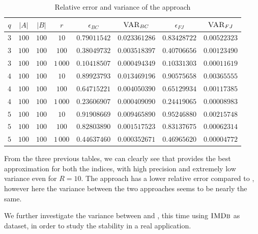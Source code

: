 \begin{table}[h]
	\centering
	\begin{tabular}{|c|c|c|c|c|c|c|c|}
		\hline
		$q$ & $|A|$ & $|B|$ & $r$      & $\epsilon_{BC}$ & $\textsc{VAR}_{BC}$ & $\epsilon_{FJ}$ & $\textsc{VAR}_{FJ}$ \\ \hline \hline
		$3$ & $100$ & $100$ & $10$     & $0.79011542$    & $0.023361286$       & $0.83428722$    & $0.00522323$        \\ \hline
		$3$ & $100$ & $100$ & $100$    & $0.38049732$    & $0.003518397$       & $0.40706656$    & $0.00123490$        \\ \hline
		$3$ & $100$ & $100$ & $1\,000$ & $0.10418507$    & $0.000494349$       & $0.10331303$    & $0.00011619$        \\ \hline \hline
		$4$ & $100$ & $100$ & $10$     & $0.89923793$    & $0.013469196$       & $0.90575658$    & $0.00365555$        \\ \hline
		$4$ & $100$ & $100$ & $100$    & $0.64715221$    & $0.004050390$       & $0.65129934$    & $0.00117385$        \\ \hline
		$4$ & $100$ & $100$ & $1\,000$ & $0.23606907$    & $0.000409090$       & $0.24419065$    & $0.00008983$        \\ \hline \hline
		$5$ & $100$ & $100$ & $10$     & $0.91908669$    & $0.009465890$       & $0.95246880$    & $0.00215748$        \\ \hline
		$5$ & $100$ & $100$ & $100$    & $0.82803890$    & $0.001517523$       & $0.83137675$    & $0.00062314$        \\ \hline
		$5$ & $100$ & $100$ & $1\,000$ & $0.44637460$    & $0.000352671$       & $0.46965620$    & $0.00004772$        \\ \hline
	\end{tabular}
	\caption{Relative error and variance of the \base approach}	
\end{table}

\clearpage

From the three previous tables, we can clearly see that \fcount provides the best approximation for both the indices, 
with high precision and extremely low variance even for $R=10$. 
The \fsamp approach has a lower relative error compared to \base, however here the variance between the two approaches seems to be nearly the same.\medskip

We further investigate the variance between \fsamp and \base, this time using $\textsc{IMDb}$ as dataset,
in order to study the stability in a real application.

